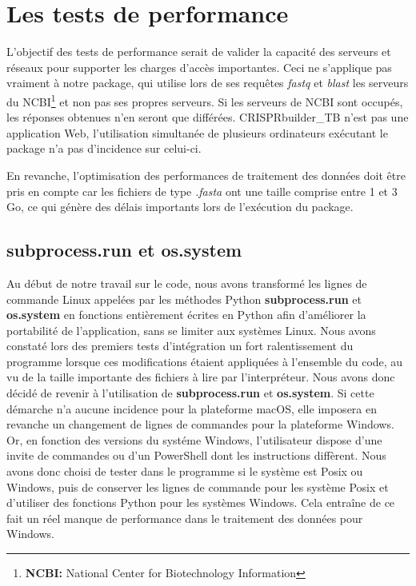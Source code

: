 \documentclass[twoside,a4paper,11pt,frenchb,openany]{report}
\begin{document}
\section{Les tests de performance}

L'objectif des tests de performance serait de valider la capacité des serveurs et réseaux pour supporter les charges d'accès importantes. Ceci ne s'applique pas vraiment à notre package, qui utilise lors de ses requêtes \textit{fastq} et \textit{blast} les serveurs du NCBI\footnote{\textbf{NCBI:} National Center for Biotechnology Information} et non pas ses propres serveurs. Si les serveurs de NCBI sont occupés, les réponses obtenues n'en seront que différées. CRISPRbuilder\_TB n'est pas une application Web, l'utilisation simultanée de plusieurs ordinateurs exécutant le package n'a pas d'incidence sur celui-ci.

En revanche, l'optimisation des performances de traitement des données doit être pris en compte car les fichiers de type \textit{.fasta} ont une taille comprise entre 1 et 3 Go, ce qui génère des délais importants lors de l'exécution du package.



\subsection{subprocess.run et os.system}

Au début de notre travail sur le code, nous avons transformé les lignes de commande Linux appelées par les méthodes Python \textbf{subprocess.run} et \textbf{os.system} en fonctions entièrement écrites en Python afin d'améliorer la portabilité de l'application, sans se limiter aux systèmes Linux. Nous avons constaté lors des premiers tests d'intégration un fort ralentissement du programme lorsque ces modifications étaient appliquées à l'ensemble du code, au vu de la taille importante des fichiers à lire par l'interpréteur. Nous avons donc décidé de revenir à l'utilisation de \textbf{subprocess.run} et \textbf{os.system}. Si cette démarche n'a aucune incidence pour la plateforme macOS, elle imposera en revanche un changement de lignes de commandes pour la plateforme Windows. Or, en fonction des versions du systéme Windows, l'utilisateur dispose d'une invite de commandes ou d'un PowerShell dont les instructions diffèrent. Nous avons donc choisi de tester dans le programme si le système est Posix ou Windows, puis de conserver les lignes de commande pour les système Posix et d'utiliser des fonctions Python pour les systèmes Windows. Cela entraîne de ce fait un réel manque de performance dans le traitement des données pour Windows. 
\end{document}
